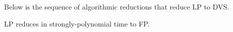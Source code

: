 \fi

Below is the sequence of algorithmic reductions that reduce LP to DVS.

\begin{lemma}\label{lem:LPtoFP}
LP reduces in strongly-polynomial time to FP.
\end{lemma}

